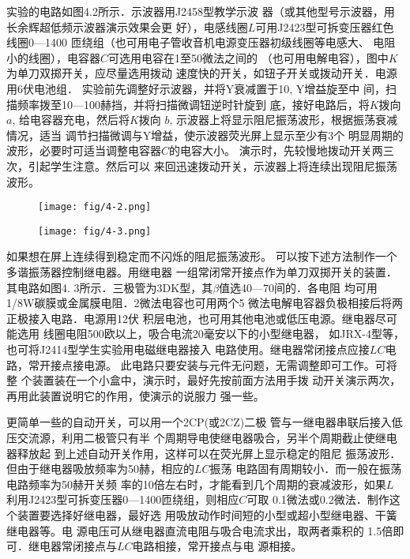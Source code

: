 实验的电路如图4.2所示．示波器用J2458型教学示波
器（或其他型号示波器，用长余辉超低频示波器演示效果会更
好），电感线圈$L$可用J2423型可拆变压器红色线圈0—1400
匝绕组（也可用电子管收音机电源变压器初级线圈等电感大、
电阻小的线圈），电容器$C$可选用电容在1至50微法之间的
（也可用电解电容），图中$K$为单刀双掷开关，应尽量选用拨动
速度快的开关，如钮子开关或拨动开关．电源用6伏电池组．
实验前先调整好示波器，并将Y衰减置于10, Y增益旋至中
间，扫描频率拨至10—100赫挡，并将扫描微调钮逆时针旋到
底，接好电路后，将$K$拨向$a$, 给电容器充电，然后将$K$拨向
$b$, 示波器上将显示阻尼振荡波形，根据振荡衰减情况，适当
调节扫描微调与Y增益，使示波器荧光屏上显示至少有3个
明显周期的波形，必要时可适当调整电容器$C$的电容大小。
演示时，先较慢地拨动开关两三次，引起学生注意。然后可以
来回迅速拨动开关，示波器上将连续出现阻尼振荡波形。

\begin{figure}[htp]\centering
    \begin{minipage}[t]{0.48\textwidth}
    \centering
\texttt{[image: fig/4-2.png]}
    \caption{}
    \end{minipage}
    \begin{minipage}[t]{0.48\textwidth}
    \centering
\texttt{[image: fig/4-3.png]}
    \caption{}
    \end{minipage}
    \end{figure}

如果想在屏上连续得到稳定而不闪烁的阻尼振荡波形。
可以按下述方法制作一个多谐振荡器控制继电器。用继电器
一组常闭常开接点作为单刀双掷开关的装置．其电路如图4.
3所示．三极管为3DK型，其$\beta$值选40—70间的．各电阻
均可用1/8W碳膜或金属膜电阻．2微法电容也可用两个5
微法电解电容器负极相接后将两正极接入电路．电源用12伏
积层电池，也可用其他电池或低压电源。继电器尽可能选用
线圈电阻500欧以上，吸合电流20毫安以下的小型继电器，
如JRX-4型等，也可将J2414型学生实验用电磁继电器接入
电路使用。继电器常闭接点应接$LC$电路，常开接点接电源。
此电路只要安装与元件无问题，无需调整即可工作。可将整
个装置装在一个小盒中，演示时，最好先按前面方法用手拨
动开关演示两次，再用此装置说明它的作用，使演示的说服力
强一些。

更简单一些的自动开关，可以用一个2CP(或2CZ)二极
管与一继电器串联后接入低压交流源，利用二极管只有半
个周期导电使继电器吸合，另半个周期截止使继电器释放起
到上述自动开关作用，这样可以在荧光屏上显示稳定的阻尼
振荡波形．但由于继电器吸放频率为50赫，相应的$LC$振荡
电路固有周期较小．而一般在振荡电路频率为50赫开关频
率的10倍左右时，才能看到几个周期的衰减波形，如果$L$
利用J2423型可拆变压器0—1400匝绕组，则相应$C$可取
0.1微法或0.2微法．制作这个装置要选择好继电器，最好选
用吸放动作时间短的小型或超小型继电器、干簧继电器等。电
源电压可从继电器直流电阻与吸合电流求出，取两者乘积的
1.5倍即可．继电器常闭接点与$LC$电路相接，常开接点与电
源相接。

